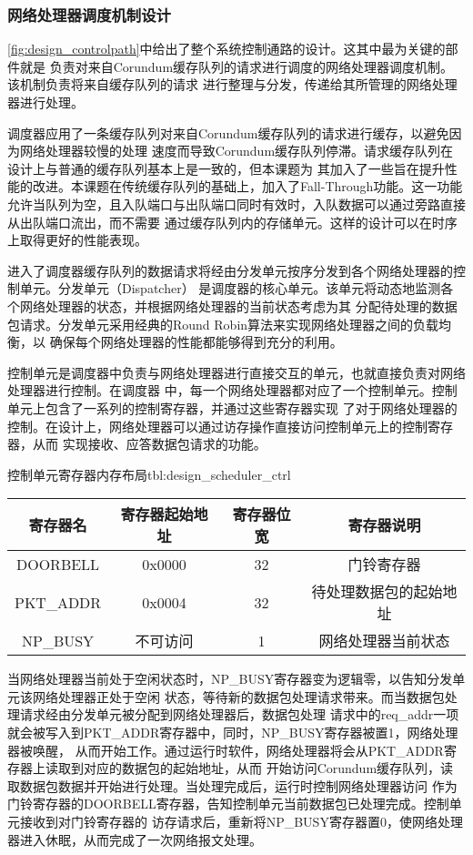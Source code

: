 \subsubsection{网络处理器调度机制设计}

\autoref{fig:design_controlpath}中给出了整个系统控制通路的设计。这其中最为关键的部件就是
负责对来自Corundum缓存队列的请求进行调度的网络处理器调度机制。该机制负责将来自缓存队列的请求
进行整理与分发，传递给其所管理的网络处理器进行处理。

调度器应用了一条缓存队列对来自Corundum缓存队列的请求进行缓存，以避免因为网络处理器较慢的处理
速度而导致Corundum缓存队列停滞。请求缓存队列在设计上与普通的缓存队列基本上是一致的，但本课题为
其加入了一些旨在提升性能的改进。本课题在传统缓存队列的基础上，加入了Fall-Through功能。这一功能
允许当队列为空，且入队端口与出队端口同时有效时，入队数据可以通过旁路直接从出队端口流出，而不需要
通过缓存队列内的存储单元。这样的设计可以在时序上取得更好的性能表现。

进入了调度器缓存队列的数据请求将经由分发单元按序分发到各个网络处理器的控制单元。分发单元（Dispatcher）
是调度器的核心单元。该单元将动态地监测各个网络处理器的状态，并根据网络处理器的当前状态考虑为其
分配待处理的数据包请求。分发单元采用经典的Round Robin算法来实现网络处理器之间的负载均衡，以
确保每个网络处理器的性能都能够得到充分的利用。

控制单元是调度器中负责与网络处理器进行直接交互的单元，也就直接负责对网络处理器进行控制。在调度器
中，每一个网络处理器都对应了一个控制单元。控制单元上包含了一系列的控制寄存器，并通过这些寄存器实现
了对于网络处理器的控制。在设计上，网络处理器可以通过访存操作直接访问控制单元上的控制寄存器，从而
实现接收、应答数据包请求的功能。

\begin{generaltab}{控制单元寄存器内存布局}{tbl:design_scheduler_ctrl}
  \begin{tabular}{cccc}
    \toprule
    寄存器名 & 寄存器起始地址 & 寄存器位宽 & 寄存器说明 \\
    \midrule
    DOORBELL & 0x0000 & 32 & 门铃寄存器 \\
    PKT\_ADDR & 0x0004 & 32 & 待处理数据包的起始地址 \\
    \midrule
    NP\_BUSY & 不可访问 & 1 & 网络处理器当前状态 \\
    \bottomrule
  \end{tabular}
\end{generaltab}

当网络处理器当前处于空闲状态时，NP\_BUSY寄存器变为逻辑零，以告知分发单元该网络处理器正处于空闲
状态，等待新的数据包处理请求带来。而当数据包处理请求经由分发单元被分配到网络处理器后，数据包处理
请求中的req\_addr一项就会被写入到PKT\_ADDR寄存器中，同时，NP\_BUSY寄存器被置1，网络处理器被唤醒，
从而开始工作。通过运行时软件，网络处理器将会从PKT\_ADDR寄存器上读取到对应的数据包的起始地址，从而
开始访问Corundum缓存队列，读取数据包数据并开始进行处理。当处理完成后，运行时控制网络处理器访问
作为门铃寄存器的DOORBELL寄存器，告知控制单元当前数据包已处理完成。控制单元接收到对门铃寄存器的
访存请求后，重新将NP\_BUSY寄存器置0，使网络处理器进入休眠，从而完成了一次网络报文处理。

